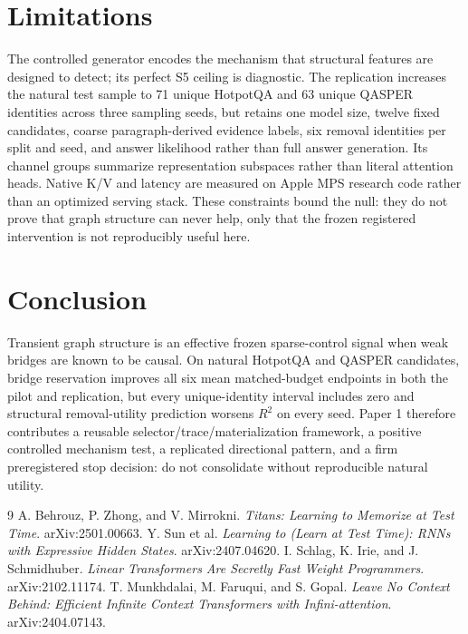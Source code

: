 \documentclass[10pt]{article}
\begin{document}
\section{Limitations}

The controlled generator encodes the mechanism that structural features are designed to detect; its perfect S5 ceiling is diagnostic. The replication increases the natural test sample to 71 unique HotpotQA and 63 unique QASPER identities across three sampling seeds, but retains one model size, twelve fixed candidates, coarse paragraph-derived evidence labels, six removal identities per split and seed, and answer likelihood rather than full answer generation. Its channel groups summarize representation subspaces rather than literal attention heads. Native K/V and latency are measured on Apple MPS research code rather than an optimized serving stack. These constraints bound the null: they do not prove that graph structure can never help, only that the frozen registered intervention is not reproducibly useful here.

\section{Conclusion}

Transient graph structure is an effective frozen sparse-control signal when weak bridges are known to be causal. On natural HotpotQA and QASPER candidates, bridge reservation improves all six mean matched-budget endpoints in both the pilot and replication, but every unique-identity interval includes zero and structural removal-utility prediction worsens $R^2$ on every seed. Paper 1 therefore contributes a reusable selector/trace/materialization framework, a positive controlled mechanism test, a replicated directional pattern, and a firm preregistered stop decision: do not consolidate without reproducible natural utility.

\begin{thebibliography}{9}
 A. Behrouz, P. Zhong, and V. Mirrokni. \emph{Titans: Learning to Memorize at Test Time}. arXiv:2501.00663.
 Y. Sun et al. \emph{Learning to (Learn at Test Time): RNNs with Expressive Hidden States}. arXiv:2407.04620.
 I. Schlag, K. Irie, and J. Schmidhuber. \emph{Linear Transformers Are Secretly Fast Weight Programmers}. arXiv:2102.11174.
 T. Munkhdalai, M. Faruqui, and S. Gopal. \emph{Leave No Context Behind: Efficient Infinite Context Transformers with Infini-attention}. arXiv:2404.07143.
\end{thebibliography}
\end{document}
